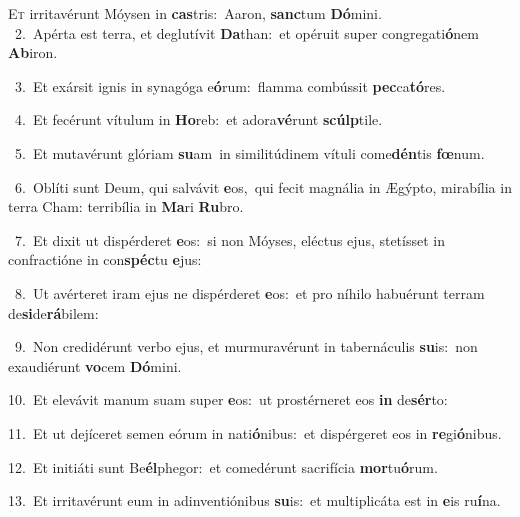 \lettrine{\initial\textcolor{\initialcolor}{E}}{t} irritavérunt Móysen in \textbf{cas}\-tris:~\star Aaron, \textbf{sanc}\-tum \textbf{Dó}\-mini.\\
{\numbfont\textcolor{\numbcolor}{~2.}}~Apérta est terra, et deglutívit \textbf{Da}\-than:~\star et opéruit super congregati\-\textbf{ó}\-nem \textbf{Ab}\-iron.\par
{\numbfont\textcolor{\numbcolor}{~3.}}~Et exársit ignis in synagóga e\-\textbf{ó}\-rum:~\star flamma combússit \textbf{pec}\-ca\-\textbf{tó}\-res.\par
{\numbfont\textcolor{\numbcolor}{~4.}}~Et fecérunt vítulum in \textbf{Ho}\-reb:~\star et adora\-\textbf{vé}\-runt \textbf{scúlp}\-tile.\par
{\numbfont\textcolor{\numbcolor}{~5.}}~Et mutavérunt glóriam \textbf{su}\-am~\star in similitúdinem vítuli come\-\textbf{dén}\-tis \textbf{fœ}\-num.\par
{\numbfont\textcolor{\numbcolor}{~6.}}~Oblíti sunt Deum, qui salvávit \textbf{e}\-os,~\star qui fecit magnália in Ægýpto, mirabília in terra Cham: terribília in \textbf{Ma}\-ri \textbf{Ru}\-bro.\par
{\numbfont\textcolor{\numbcolor}{~7.}}~Et dixit ut dispérderet \textbf{e}\-os:~\star si non Móyses, eléctus ejus, stetísset in confractióne in con\-\textbf{spéc}\-tu \textbf{e}\-jus:\par
{\numbfont\textcolor{\numbcolor}{~8.}}~Ut avérteret iram ejus ne dispérderet \textbf{e}\-os:~\star et pro níhilo habuérunt terram de\-\textbf{si}\-de\-\textbf{rá}\-bilem:\par
{\numbfont\textcolor{\numbcolor}{~9.}}~Non credidérunt verbo ejus, et murmuravérunt in tabernáculis \textbf{su}\-is:~\star non exaudiérunt \textbf{vo}\-cem \textbf{Dó}\-mini.\par
{\numbfont\textcolor{\numbcolor}{10.}}~Et elevávit manum suam super \textbf{e}\-os:~\star ut prostérneret eos \textbf{in} de\-\textbf{sér}\-to:\par
{\numbfont\textcolor{\numbcolor}{11.}}~Et ut dejíceret semen eórum in nati\-\textbf{ó}\-nibus:~\star et dispérgeret eos in \textbf{re}\-gi\-\textbf{ó}\-nibus.\par
{\numbfont\textcolor{\numbcolor}{12.}}~Et initiáti sunt Be\-\textbf{él}\-phegor:~\star et comedérunt sacrifícia \textbf{mor}\-tu\-\textbf{ó}\-rum.\par
{\numbfont\textcolor{\numbcolor}{13.}}~Et irritavérunt eum in adinventiónibus \textbf{su}\-is:~\star et multiplicáta est in \textbf{e}\-is ru\-\textbf{í}\-na.\par
